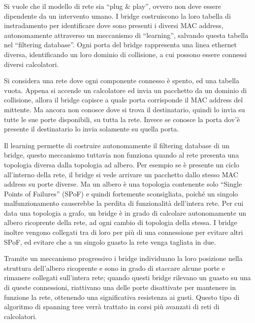 \documentclass{article}
\numberwithin{equation}{subsection}
\begin{document}

Si vuole che il modello di rete sia ``plug \& play'', ovvero non deve essere dipendente da un intervento umano. 
I bridge costruiscono la loro tabella di instradamento per identificare dove sono presenti i diversi MAC address, autonomamente attraverso un meccanismo di ``learning'', 
salvando questa tabella nel ``filtering database''. Ogni porta del bridge rappresenta una linea ethernet diversa, identificando un loro dominio di collisione, a cui 
possono essere connessi diversi calcolatori. 

Si considera una rete dove ogni componente connesso è spento, ed una tabella vuota. Appena si accende un calcolatore ed invia un pacchetto da un dominio di collisione, 
allora il bridge capisce a quale porta corrisponde il MAC address del mittente. Ma ancora non conosce dove si trova il destinatario, quindi lo invia su tutte le sue 
porte disponibili, su tutta la rete. Invece se conosce la porta dov'è presente il destinatario lo invia solamente su quella porta. 


Il learning permette di costruire autonomamente il filtering database di un bridge, questo meccanismo tuttavia non funziona quando al rete presenta una topologia diversa 
dalla topologia ad albero. Per esempio se è presente un ciclo all'interno della rete, il bridge si vede arrivare un pacchetto dallo stesso MAC address su porte diverse. 
Ma un albero è una topologia contenente solo ``Single Points of Failures'' (SPoF) e quindi fortemente sconsigliata, poiché un singolo malfunzionamento causerebbe la 
perdita di funzionalità dell'intera rete. Per cui data una topologia a grafo, un bridge è in grado di calcolare autonomamente un albero 
ricoprente della rete, ad ogni cambio di topologia della stessa. I bridge inoltre vengono collegati tra di loro per più di una connessione per evitare altri SPoF, ed 
evitare che a un singolo guasto la rete venga tagliata in due. 

Tramite un meccanismo progressivo i bridge individuano la loro posizione nella struttura dell'albero ricoprente e sono in grado di staccare alcune porte e rimanere 
collegati sull'intera rete; quando questi bridge rilevano un guasto su una di queste connessioni, riattivano una delle porte disattivate per mantenere in funzione la 
rete, ottenendo una significativa resistenza ai gusti. 
Questo tipo di algoritmo di spanning tree verrà trattato in corsi più avanzati di reti di calcolatori. 
\end{document}
